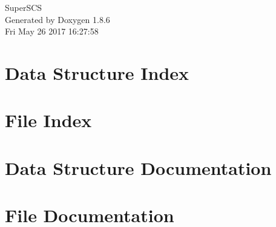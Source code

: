 \documentclass[twoside]{book}
\newcommand{\clearemptydoublepage}{%
  \newpage{\pagestyle{empty}\cleardoublepage}%
}
\begin{document}
\hypersetup{pageanchor=false}
\begin{titlepage}
\vspace*{7cm}
\begin{center}%
{\Large Super\-S\-C\-S }\\
\vspace*{1cm}
{\large Generated by Doxygen 1.8.6}\\
\vspace*{0.5cm}
{\small Fri May 26 2017 16:27:58}\\
\end{center}
\end{titlepage}
\clearemptydoublepage
\tableofcontents
\clearemptydoublepage
{}
\hypersetup{pageanchor=true}

\chapter{Data Structure Index}

\chapter{File Index}

\chapter{Data Structure Documentation}












\chapter{File Documentation}























\newpage
{}
{}
\printindex
\end{document}
